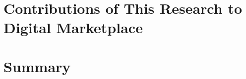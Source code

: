 \section{Contributions of This Research to Digital Marketplace} %
\label{sec:contributions_of_this_research_to_digital_marketplace_dmp}


\section{Summary} %
\label{sec:summary_dmp}

